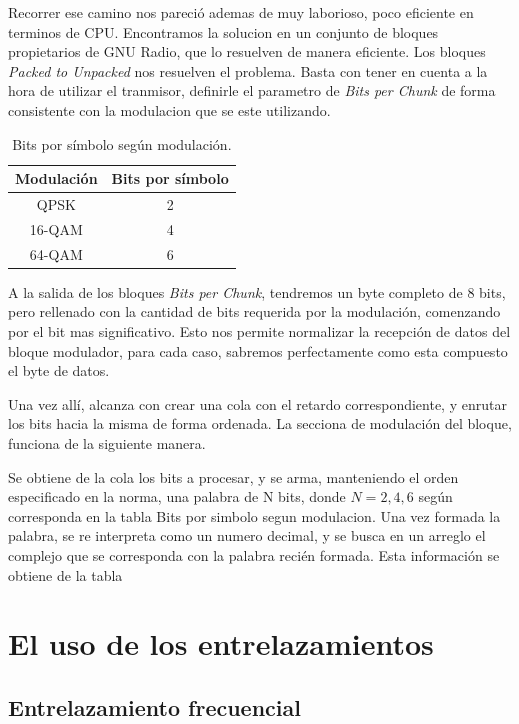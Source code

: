 Recorrer ese camino nos pareció ademas de muy laborioso, poco eficiente en terminos de CPU. Encontramos la solucion en un conjunto de bloques propietarios de GNU Radio, que lo resuelven de manera eficiente. Los bloques \textit{Packed to Unpacked} nos resuelven el problema. Basta con tener en cuenta a la hora de utilizar el tranmisor, definirle el parametro de \textit{Bits per Chunk} de forma consistente con la modulacion que se este utilizando. 

\begin{table}[h!]
	\centering
	\begin{tabular}{|c|c|}
		\hline
		\textbf{Modulación} & \textbf{Bits por símbolo}\\
		\hline
		QPSK		& 2\\
		\hline
		16-QAM 		& 4\\
		\hline
		64-QAM		& 6\\
		\hline
	\end{tabular}
	\caption{\label{Bits por simbolo segun modulacion} Bits por símbolo según modulación.}
\end{table}

A la salida de los bloques \textit{Bits per Chunk}, tendremos un byte completo de 8 bits, pero rellenado con la cantidad de bits requerida por la modulación, comenzando por el bit mas significativo.  Esto nos permite normalizar la recepción de datos del bloque modulador, para cada caso, sabremos perfectamente como esta compuesto el byte de datos. 

Una vez allí, alcanza con crear una cola con el retardo correspondiente, y enrutar los bits hacia la misma de forma ordenada. La secciona de modulación del bloque, funciona de la siguiente manera. 

Se obtiene de la cola los bits a procesar, y se arma, manteniendo el orden especificado en la norma, una palabra de N bits, donde $N={2,4,6}$ según corresponda en la tabla \tablename{Bits por simbolo segun modulacion}. Una vez formada la palabra, se re interpreta como un numero decimal, y se busca en un arreglo el complejo que se corresponda con la palabra recién formada. Esta información se obtiene de la tabla   

\section{El uso de los entrelazamientos}

\subsection{Entrelazamiento frecuencial}

